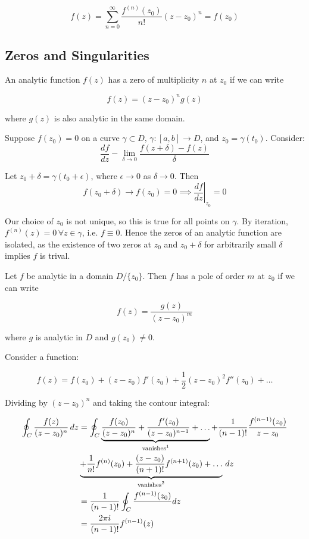 \documentclass{../../physics_notes}
\begin{document}
\begin{equation}
f(z) = \sum_{n=0}^\infty \frac{f^{(n)}(z_0)}{n!} (z-z_0)^n = f(z_0)
\end{equation}

\subsection{Zeros and Singularities }

An analytic function $f(z)$ has a zero of multiplicity $n$ at $z_0$ if we can write 

\begin{equation}
f(z) = (z-z_0)^n g(z)
\end{equation}

where $g(z)$ is also analytic in the same domain. 

Suppose $f(z_0) = 0$ on a curve $\gamma \subset D, \, \gamma: [a,b] \to D$, and $z_0 = \gamma(t_0)$. Consider:
\[ \frac{df}{dz} - \lim_{\delta\to 0} \frac{f(z+\delta) - f(z)}{\delta}\]

Let $z_0 + \delta = \gamma(t_0 + \epsilon)$, where $\epsilon \to 0$ as $\delta \to 0$. Then
\[ f(z_0 + \delta) \to f(z_0) = 0 \implies \left.\frac{df}{dz}\right|_{z_0} = 0 \]

Our choice of $z_0$ is not unique, so this is true for all points on $\gamma$. By iteration, $f^{(n)}(z) = 0 \, \forall z \in \gamma$, i.e. $f \equiv 0$. Hence the zeros of an analytic function are isolated, as the existence of two zeros at $z_0$ and $z_0 + \delta$ for arbitrarily small $\delta$ implies $f$ is trival.

Let $f$ be analytic in a domain $D/\{z_0\}$. Then $f$ has a pole of order $m$ at $z_0$ if we can write

\begin{equation}
f(z) = \frac{g(z)}{(z - z_0)^m}
\end{equation}

where $g$ is analytic in $D$ and $g(z_0) \neq 0$. 

Consider a function:

\[ f(z) = f(z_0) + (z-z_0)f'(z_0) + \frac{1}{2}(z-z_0)^2f''(z_0) + \dots \]

Dividing by $(z-z_0)^n$ and taking the contour integral:

\begin{align*} \oint_C \frac{f(z)}{(z-z_0)^n}\, dz &= \oint_C \underbrace{\frac{f(z_0)}{(z-z_0)^n} + \frac{f'(z_0)}{(z-z_0)^{n-1}} + \dots}_\text{vanishes\footnotemark} + \frac{1}{(n-1)!}\frac{f^{(n-1)}(z_0)}{z - z_0} \\ 
&\underbrace{ + \frac{1}{n!}f^{(n)}(z_0) + \frac{(z - z_0)}{(n+1)!}f^{(n+1)}(z_0) + \dots}_\text{vanishes\footnotemark} \, dz \\
&= \frac{1}{(n-1)!} \oint_C \frac{f^{(n-1)}(z_0)} \, dz \\
&= \frac{2\pi i}{(n-1)!} f^{(n-1)}(z) \end{align*}
\end{document}

